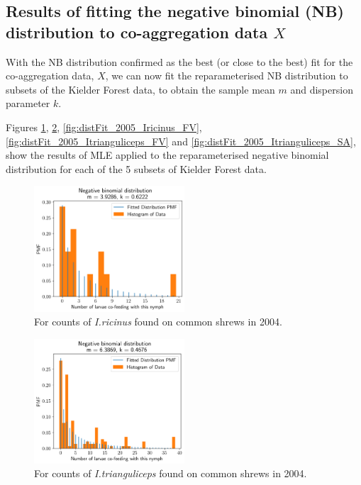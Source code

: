\documentclass[hidelinks]{article}
\begin{document}
\clearpage

\subsection{Results of fitting the negative binomial (NB) distribution to co-aggregation data \texorpdfstring{$ X $}{X}}

With the NB distribution confirmed as the best (or close to the best) fit for the co-aggregation data, $ X $, we can now fit the reparameterised NB distribution to subsets of the Kielder Forest data, to obtain the sample mean $ m $ and dispersion parameter $ k $.

Figures \ref{fig:distFit_2004_Iricinus_SA}, \ref{fig:distFit_2004_Itrianguliceps_SA}, \ref{fig:distFit_2005_Iricinus_FV}, \ref{fig:distFit_2005_Itrianguliceps_FV} and \ref{fig:distFit_2005_Itrianguliceps_SA}, show the results of MLE applied to the reparameterised negative binomial distribution for each of the 5 subsets of Kielder Forest data.

\begin{figure}[ht]
	\begin{mdframed}[backgroundcolor=grey250,rightline=false,leftline=false,topline=false]
	\includegraphics[width=0.5\textwidth, center]{coaggregation_dist_2004_I.ricinus_SA.png}
	\caption{For counts of \textit{I.ricinus} found on common shrews in 2004.}
	\label{fig:distFit_2004_Iricinus_SA}
	\end{mdframed}
\end{figure}

\begin{figure}[ht]
	\begin{mdframed}[backgroundcolor=grey250,rightline=false,leftline=false,topline=false]
	\includegraphics[width=0.5\textwidth, center]{coaggregation_dist_2004_I.trianguliceps_SA.png}
	\caption{For counts of \textit{I.trianguliceps} found on common shrews in 2004.}
	\label{fig:distFit_2004_Itrianguliceps_SA}
	\end{mdframed}
\end{figure}
\end{document}
